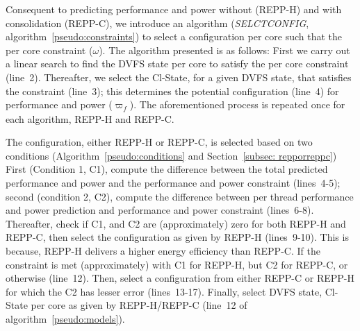 

Consequent to predicting performance and power without (REPP-H) and with consolidation
(REPP-C), we introduce an algorithm (\textsl{SELCTCONFIG},
algorithm~\ref{pseudo:constraints}) to select a configuration per core such that the per
core constraint ($\omega$).  The algorithm presented is as follows: First we carry out a
linear search to find the DVFS state per core to satisfy the per core constraint (line~2).
Thereafter, we select the Cl-State, for a given DVFS state, that satisfies the constraint
(line~3); this determines the potential configuration (line~4) for performance and power
($\varpi_{\mathit{f}}$). The aforementioned process is repeated once for each algorithm,
REPP-H and REPP-C.


The configuration, either REPP-H or REPP-C, is selected based on two conditions
(Algorithm~\ref{pseudo:conditions} and Section~\ref{subsec: repporreppc})
First (Condition 1, \textsf{C1}), compute the
difference between the total predicted performance and power and the performance and power
constraint (lines~4-5); second (condition 2, \textsf{C2}), compute the difference between
per thread performance and power prediction and performance and power constraint
(lines~6-8). Thereafter, check if \textsf{C1}, and \textsf{C2} are (approximately) zero
for both REPP-H and REPP-C, then select the configuration as given by REPP-H (lines~9-10).
This is because, REPP-H delivers a higher energy efficiency than REPP-C. If the constraint
is met (approximately) with \textsf{C1} for REPP-H, but \textsf{C2} for REPP-C, or
otherwise (line~12). Then, select a configuration from either REPP-C or REPP-H for which
the \textsf{C2} has lesser error (lines~13-17). Finally, select DVFS state, Cl-State per core
as given by REPP-H/REPP-C (line~12 of algorithm~\ref{pseudo:models}).

